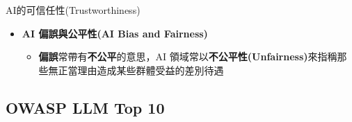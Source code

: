 \documentclass[aspectratio=1610]{Common/MyCourseBeamer}
\begin{document}
\begin{frame}[allowframebreaks]{AI的可信任性(Trustworthiness)\cite{ISO22989:2022}}
\begin{itemize}
\begin{itemize}
		\end{itemize}
		
		\item \textbf{AI 偏誤與公平性(AI Bias and Fairness)}
		\begin{itemize}
			
			\item \textbf{偏誤}常帶有\textbf{不公平}的意思，AI 領域常以\textbf{不公平性(Unfairness)}來指稱那些無正當理由造成某些群體受益的差別待遇
			
			
			
		\end{itemize}
	\end{itemize}
	
\end{frame}

\subsection{OWASP LLM Top 10}
\end{document}
